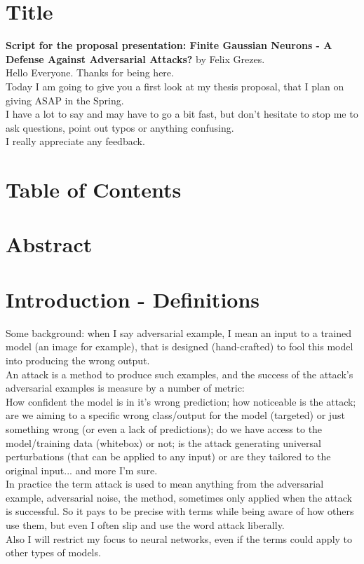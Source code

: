 \documentclass{article}
\begin{document}

\section{Title}
\textbf{Script for the proposal presentation: Finite Gaussian Neurons - A Defense Against Adversarial Attacks?} by Felix Grezes.\\

Hello Everyone. Thanks for being here.\\
Today I am going to give you a first look at my thesis proposal, that I plan on giving ASAP in the Spring.\\
I have a lot to say and may have to go a bit fast, but don't hesitate to stop me to ask questions, point out typos or anything confusing.\\
I really appreciate any feedback.

\section{Table of Contents}

\section{Abstract}

\section{Introduction - Definitions}
Some background: when I say adversarial example, I mean
an input to a trained model (an image for example), that is designed (hand-crafted) to fool this model into producing the wrong output.\\
An attack is a method to produce such examples, and the success of the attack's adversarial examples is measure by a number of metric:\\
How confident the model is in it's wrong prediction; how noticeable is the attack; are we aiming to a specific wrong class/output for the model (targeted) or just something 
 wrong (or even a lack of predictions); do we have access to the model/training data (whitebox) or not; is the attack generating universal perturbations (that can be applied to any input) or are they tailored to the original input... and more I'm sure.\\
In practice the term attack is used to mean anything from the adversarial example, adversarial noise, the method, sometimes only applied when the attack is successful. So it pays to be precise with terms while being aware of how others use them, but even I often slip and use the word attack liberally.\\
Also I will restrict my focus to neural networks, even if the terms could apply to other types of models.
\end{document}
